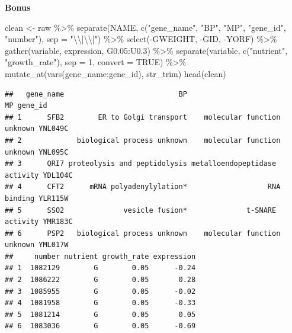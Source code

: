 \documentclass[
]{book}
\newenvironment{Shaded}{\begin{snugshade}}{\end{snugshade}}
\newcommand{\AttributeTok}[1]{\textcolor[rgb]{0.77,0.63,0.00}{#1}}
\newcommand{\ConstantTok}[1]{\textcolor[rgb]{0.00,0.00,0.00}{#1}}
\newcommand{\DecValTok}[1]{\textcolor[rgb]{0.00,0.00,0.81}{#1}}
\newcommand{\FloatTok}[1]{\textcolor[rgb]{0.00,0.00,0.81}{#1}}
\newcommand{\FunctionTok}[1]{\textcolor[rgb]{0.00,0.00,0.00}{#1}}
\newcommand{\NormalTok}[1]{#1}
\newcommand{\OtherTok}[1]{\textcolor[rgb]{0.56,0.35,0.01}{#1}}
\newcommand{\SpecialCharTok}[1]{\textcolor[rgb]{0.00,0.00,0.00}{#1}}
\newcommand{\StringTok}[1]{\textcolor[rgb]{0.31,0.60,0.02}{#1}}
\begin{document}
\textbf{Bonus}

\begin{Shaded}
\begin{Highlighting}[]
\NormalTok{clean }\OtherTok{\textless{}{-}}\NormalTok{ raw }\SpecialCharTok{\%\textgreater{}\%}
  \FunctionTok{separate}\NormalTok{(NAME, }\FunctionTok{c}\NormalTok{(}\StringTok{"gene\_name"}\NormalTok{, }\StringTok{"BP"}\NormalTok{, }\StringTok{"MP"}\NormalTok{, }\StringTok{"gene\_id"}\NormalTok{, }\StringTok{"number"}\NormalTok{), }\AttributeTok{sep =} \StringTok{"}\SpecialCharTok{\textbackslash{}\textbackslash{}}\StringTok{|}\SpecialCharTok{\textbackslash{}\textbackslash{}}\StringTok{|"}\NormalTok{) }\SpecialCharTok{\%\textgreater{}\%}
  \FunctionTok{select}\NormalTok{(}\SpecialCharTok{{-}}\NormalTok{GWEIGHT, }\SpecialCharTok{{-}}\NormalTok{GID, }\SpecialCharTok{{-}}\NormalTok{YORF) }\SpecialCharTok{\%\textgreater{}\%}
  \FunctionTok{gather}\NormalTok{(variable, expression, G0}\FloatTok{.05}\SpecialCharTok{:}\NormalTok{U0}\FloatTok{.3}\NormalTok{) }\SpecialCharTok{\%\textgreater{}\%}
  \FunctionTok{separate}\NormalTok{(variable, }\FunctionTok{c}\NormalTok{(}\StringTok{"nutrient"}\NormalTok{, }\StringTok{"growth\_rate"}\NormalTok{), }\AttributeTok{sep =} \DecValTok{1}\NormalTok{, }\AttributeTok{convert =} \ConstantTok{TRUE}\NormalTok{) }\SpecialCharTok{\%\textgreater{}\%}
  \FunctionTok{mutate\_at}\NormalTok{(}\FunctionTok{vars}\NormalTok{(gene\_name}\SpecialCharTok{:}\NormalTok{gene\_id), str\_trim)}
\FunctionTok{head}\NormalTok{(clean)}
\end{Highlighting}
\end{Shaded}

\begin{verbatim}
##   gene_name                           BP                            MP gene_id
## 1      SFB2        ER to Golgi transport    molecular function unknown YNL049C
## 2             biological process unknown    molecular function unknown YNL095C
## 3      QRI7 proteolysis and peptidolysis metalloendopeptidase activity YDL104C
## 4      CFT2      mRNA polyadenylylation*                   RNA binding YLR115W
## 5      SSO2              vesicle fusion*              t-SNARE activity YMR183C
## 6      PSP2   biological process unknown    molecular function unknown YML017W
##     number nutrient growth_rate expression
## 1  1082129        G        0.05      -0.24
## 2  1086222        G        0.05       0.28
## 3  1085955        G        0.05      -0.02
## 4  1081958        G        0.05      -0.33
## 5  1081214        G        0.05       0.05
## 6  1083036        G        0.05      -0.69
\end{verbatim}
\end{document}
